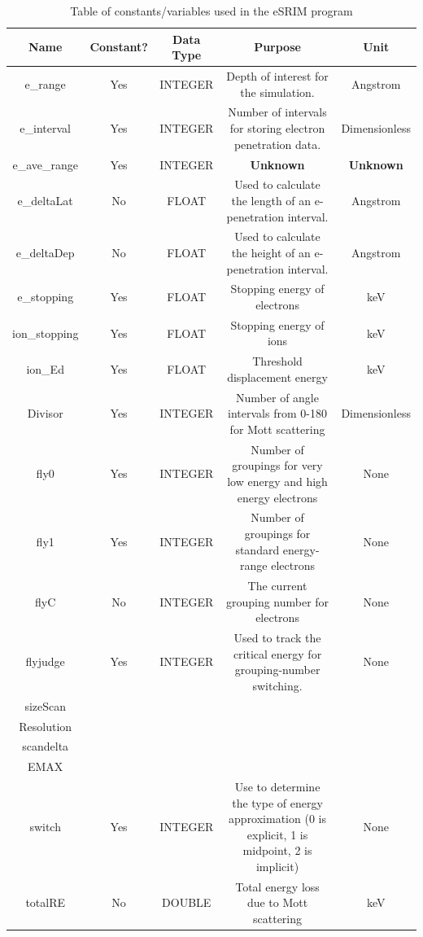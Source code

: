 \documentclass[10pt, reqno]{exam}
\begin{document}
{    
    \begin{longtable}{|c|c|c|c|c|}
        \caption{Table of constants/variables used in the eSRIM program}
        \label{tbl:constants_and_variables} \\
        \hline
        Name & Constant? & Data Type & Purpose & Unit \\
        \hline
        e\_range & Yes & INTEGER & Depth of interest for the simulation. & Angstrom \\
        e\_interval & Yes & INTEGER & Number of intervals for storing electron penetration data. & Dimensionless \\
        e\_ave\_range & Yes & INTEGER & \textbf{Unknown} & \textbf{Unknown} \\
        e\_deltaLat & No & FLOAT & Used to calculate the length of an e-penetration interval. & Angstrom \\
        e\_deltaDep & No & FLOAT & Used to calculate the height of an e-penetration interval. & Angstrom \\
        e\_stopping & Yes & FLOAT & Stopping energy of electrons & keV \\
        ion\_stopping & Yes & FLOAT & Stopping energy of ions & keV \\
        ion\_Ed & Yes & FLOAT & Threshold displacement energy & keV \\
        Divisor & Yes & INTEGER & Number of angle intervals from 0-180 for Mott scattering & Dimensionless \\
        fly0 & Yes & INTEGER & Number of groupings for very low energy and high energy electrons & None \\
        fly1 & Yes & INTEGER & Number of groupings for standard energy-range electrons & None \\
        flyC & No & INTEGER & The current grouping number for electrons & None \\
        flyjudge & Yes & INTEGER & Used to track the critical energy for grouping-number switching. & None \\
        sizeScan & & & & \\
        Resolution & & & & \\
        scandelta & & & & \\
        EMAX & & & & \\
        switch & Yes & INTEGER & Use to determine the type of energy approximation (0 is explicit, 1 is midpoint, 2 is implicit) & None \\
        \hline
        totalRE & No & DOUBLE & Total energy loss due to Mott scattering & keV \\

\end{longtable}}
\end{document}
